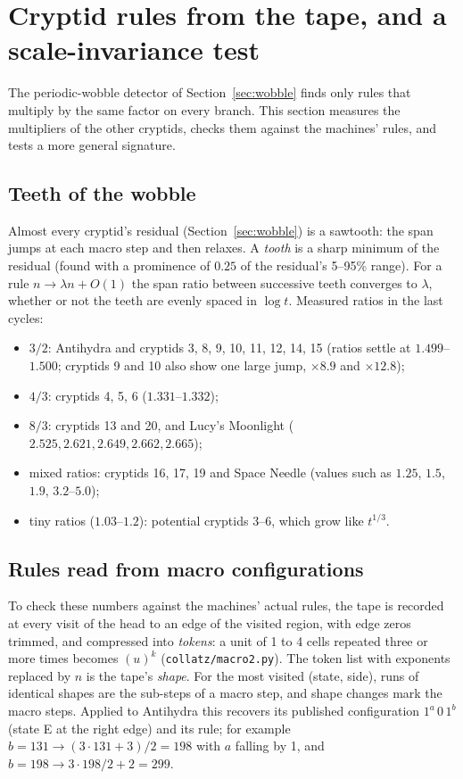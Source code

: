 \documentclass[11pt,a4paper]{article}
\begin{document}
\section{Cryptid rules from the tape, and a scale-invariance test}
\label{sec:cryptids}

The periodic-wobble detector of Section~\ref{sec:wobble} finds only rules that multiply by the same
factor on every branch. This section measures the multipliers of the other cryptids, checks them
against the machines' rules, and tests a more general signature.

\subsection{Teeth of the wobble}
Almost every cryptid's residual (Section~\ref{sec:wobble}) is a sawtooth: the span jumps at each
macro step and then relaxes. A \emph{tooth} is a sharp minimum of the residual (found with a
prominence of $0.25$ of the residual's 5--95\% range). For a rule $n \to \lambda n + O(1)$ the
span ratio between successive teeth converges to $\lambda$, whether or not the teeth are evenly
spaced in $\log t$. Measured ratios in the last cycles:
\begin{itemize}
\item $3/2$: Antihydra and cryptids 3, 8, 9, 10, 11, 12, 14, 15 (ratios settle at $1.499$--$1.500$;
cryptids 9 and 10 also show one large jump, $\times8.9$ and $\times12.8$);
\item $4/3$: cryptids 4, 5, 6 ($1.331$--$1.332$);
\item $8/3$: cryptids 13 and 20, and Lucy's Moonlight ($2.525, 2.621, 2.649, 2.662, 2.665$);
\item mixed ratios: cryptids 16, 17, 19 and Space Needle (values such as $1.25$, $1.5$, $1.9$,
$3.2$--$5.0$);
\item tiny ratios ($1.03$--$1.2$): potential cryptids 3--6, which grow like $t^{1/3}$.
\end{itemize}

\subsection{Rules read from macro configurations}
To check these numbers against the machines' actual rules, the tape is recorded at every visit of
the head to an edge of the visited region, with edge zeros trimmed, and compressed into
\emph{tokens}: a unit of 1 to 4 cells repeated three or more times becomes $(u)^k$
(\texttt{collatz/macro2.py}). The token list with exponents replaced by $n$ is the tape's
\emph{shape}. For the most visited (state, side), runs of identical shapes are the sub-steps of a
macro step, and shape changes mark the macro steps. Applied to Antihydra this recovers its
published configuration $1^a\,0\,1^b$ (state E at the right edge) and its rule; for example
$b = 131 \to (3\cdot131+3)/2 = 198$ with $a$ falling by 1, and $b = 198 \to 3\cdot198/2 + 2 = 299$.
\end{document}
